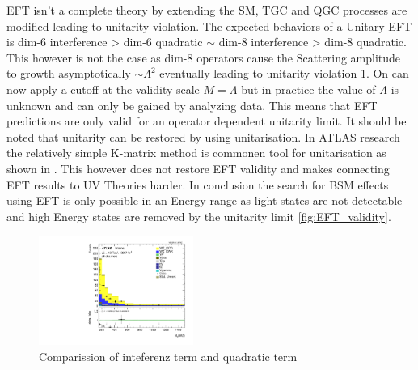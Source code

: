 \documentclass[../Bachelorarbeit.tex]{subfiles}
\begin{document}
EFT isn't a complete theory by extending the SM, TGC and QGC processes are modified leading to unitarity violation. The expected behaviors of a Unitary EFT is dim-6 interference > dim-6 quadratic $\sim$ dim-8 interference > dim-8 quadratic.
This however is not the case as dim-8 operators cause the Scattering amplitude to growth asymptotically $\sim \Lambda^{2}$ eventually leading to unitarity violation \ref{fig:dim8_quad_int_comparission}.
On can now apply a cutoff at the validity scale $M=\Lambda$ but in practice the value of $\Lambda$ is unknown and can only be gained by analyzing data. This means that EFT predictions are only valid for an operator dependent unitarity limit.
It should be noted that unitarity can be restored by using unitarisation. In ATLAS research the relatively simple K-matrix method is commonen tool for unitarisation as shown in \cite{Kilian.2015}. This however does not restore EFT validity and
makes connecting EFT results to UV Theories harder. In conclusion the search for BSM effects using EFT is only possible in an Energy range as light states are not detectable and high Energy states are removed by the unitarity limit \ref{fig:EFT_validity}. 
\begin{figure}[h]
    \centering
    \centering
    \includegraphics[width=0.45\textwidth]{Plots/Sm_re/all_VV_MTWZ.pdf}
    \caption{Comparission of inteferenz term and quadratic term}
    \label{fig:dim8_quad_int_comparission}
\end{figure}
\end{document}
